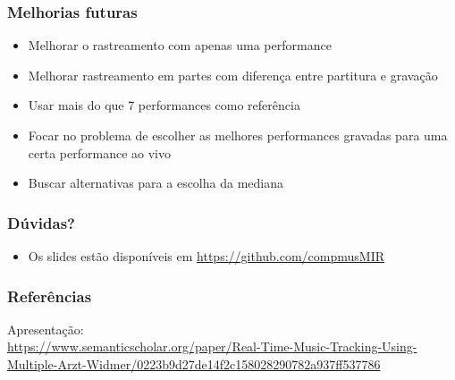 \begin{frame}
  \frametitle{Melhorias futuras}
  \begin{itemize}
    \item Melhorar o rastreamento com apenas uma performance\pause
    \item Melhorar rastreamento em partes com diferença entre partitura e gravação \pause
    \item Usar mais do que 7 performances como referência \pause
    \item Focar no problema de escolher as melhores performances gravadas para uma certa performance ao vivo \pause
    \item Buscar alternativas para a escolha da mediana
  \end{itemize}
\end{frame}

\begin{frame}
  \frametitle{Dúvidas?}
  \begin{itemize}
    \item Os slides estão disponíveis em \url{https://github.com/compmusMIR}
  \end{itemize}
\end{frame}

\begin{frame}
  \frametitle{Referências}
  \small
  Apresentação:\\
  \vspace{2mm}
  \url{https://www.semanticscholar.org/paper/Real-Time-Music-Tracking-Using-Multiple-Arzt-Widmer/0223b9d27de14f2c158028290782a937ff537786}


\end{frame}
